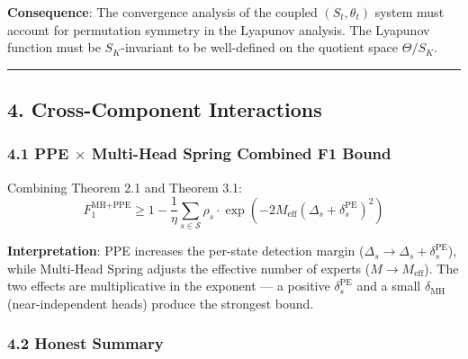 \documentclass[
  12pt,
]{article}
\begin{document}
\textbf{Consequence}: The convergence analysis of the coupled $(S_t, \theta_t)$ system must account for permutation symmetry in the Lyapunov analysis. The Lyapunov function must be $S_K$-invariant to be well-defined on the quotient space $\Theta/S_K$.

\begin{center}\rule{0.5\linewidth}{0.5pt}\end{center}

\subsection{4. Cross-Component Interactions}\label{cross-component-interactions}

\subsubsection{4.1 PPE $\times$ Multi-Head Spring Combined F1 Bound}\label{ppe-x-multi-head-combined}

Combining Theorem 2.1 and Theorem 3.1:
\[\boxed{F_1^{\text{MH+PPE}} \geq 1 - \frac{1}{\eta} \sum_{s \in \mathcal{S}} \rho_s \cdot \exp\left(-2M_{\text{eff}} (\Delta_s + \delta_s^{\text{PE}})^2\right)}\]

\textbf{Interpretation}: PPE increases the per-state detection margin ($\Delta_s \to \Delta_s + \delta_s^{\text{PE}}$), while Multi-Head Spring adjusts the effective number of experts ($M \to M_{\text{eff}}$). The two effects are multiplicative in the exponent --- a positive $\delta_s^{\text{PE}}$ and a small $\delta_{\text{MH}}$ (near-independent heads) produce the strongest bound.

\subsubsection{4.2 Honest Summary}\label{honest-summary}
\end{document}
